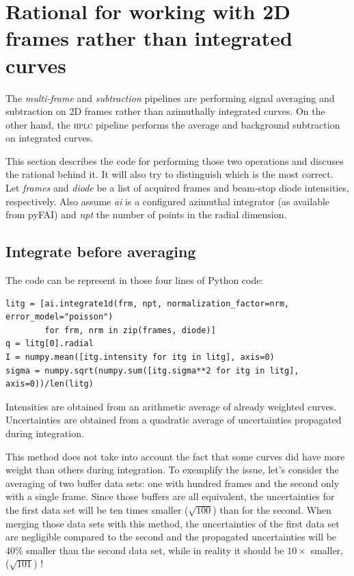 \documentclass[preprint]{iucr}              %
\begin{document}
\section{Rational for working with 2D frames rather than integrated curves}
\label{rational}
The \textit{multi-frame} and \textit{subtraction} pipelines are performing signal averaging and subtraction on 2D frames rather than azimuthally integrated curves.
On the other hand, the \textsc{hplc} pipeline performs the average and background subtraction on integrated curves.

This section describes the code for performing those two operations and discuses the rational behind it.
It will also try to distinguish which is the most correct. 
Let \textit{frames} and \textit{diode} be a list of acquired frames and beam-stop diode intensities, respectively.
Also assume \textit{ai} is a configured azimuthal integrator (as available from pyFAI) and \textit{npt} the number of points in the radial dimension.

\subsection{Integrate before averaging}
The code can be represent in those four lines of Python code:
\begin{verbatim} 
litg = [ai.integrate1d(frm, npt, normalization_factor=nrm, error_model="poisson") 
        for frm, nrm in zip(frames, diode)]
q = litg[0].radial
I = numpy.mean([itg.intensity for itg in litg], axis=0)
sigma = numpy.sqrt(numpy.sum([itg.sigma**2 for itg in litg], axis=0))/len(litg)
\end{verbatim}

Intensities are obtained from an arithmetic average of already weighted curves.
Uncertainties are obtained from a quadratic average of uncertainties propagated during integration. 

This method does not take into account the fact that some curves did have more weight than others during integration.
To exemplify the issue, let's consider the averaging of two buffer data sets: one with hundred frames and the second only with a single frame.
Since those buffers are all equivalent, the uncertainties for the first data set will be ten times smaller ($\sqrt{100}$) than for the second.
When merging those data sets with this method, the uncertainties of the first data set are negligible compared to the second and the propagated uncertainties will be 40\% smaller than the second data set, while in reality it should be $10\times$ smaller, ($\sqrt{101}$) ! 
\end{document}
